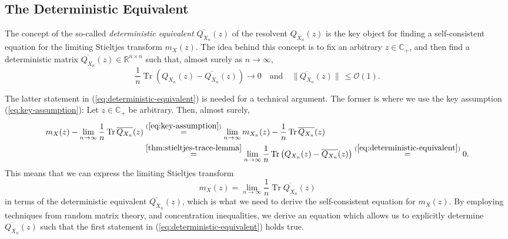 \documentclass{article}
\begin{document}
\subsection{The Deterministic Equivalent} \label{sec:deterministic-equivalent}
The concept of the so-called \emph{deterministic equivalent} $\overline{Q_{X_n}}(z)$ of the resolvent $Q_{X_n}(z)$ is the key object for finding a self-consistent equation for the limiting Stieltjes transform $m_X(z)$. The idea behind this concept is to fix an arbitrary $z\in\mathbb{C}_+$, and then find a deterministic matrix $\overline{Q_{X_n}}(z)\in\mathbb{R}^{n\times n}$ such that, almost surely as $n\to\infty$,
\begin{equation}
\frac{1}{n}\operatorname{Tr}\left(Q_{X_n}(z)- \overline{Q_{X_n}}(z)\right)\to0\quad\text{and}\quad\|\overline{Q_{X_n}}(z)\|\,\leq\mathcal{O}(1).\label{eq:deterministic-equivalent}
\end{equation}
\bigskip
\par
The latter statement in (\ref{eq:deterministic-equivalent}) is needed for a technical argument. The former is where we use the key assumption (\ref{eq:key-assumption}): Let $z\in\mathbb{C}_+$ be arbitrary. Then, almost surely,
\begin{align}
m_X(z)-\lim_{n\to\infty}\frac{1}{n}\operatorname{Tr}\overline{Q_{X_n}}(z) &\stackrel{(\ref{eq:key-assumption})}{=} \lim_{n\to\infty}m_{X_n}(z)-\frac{1}{n}\operatorname{Tr}\overline{Q_{X_n}}(z) \notag
\\ & \stackrel{\ref{thm:stieltjes-trace-lemma}}{=} \lim_{n\to\infty}\frac{1}{n}\operatorname{Tr}\left(Q_{X_n}(z)-\overline{Q_{X_n}}(z)\right)\stackrel{(\ref{eq:deterministic-equivalent})}{=}0.
\end{align}
This means that we can express the limiting Stieltjes transform
\begin{equation}
m_X(z)=\lim_{n\to\infty}\frac{1}{n}\operatorname{Tr}\overline{Q_{X_n}}(z)\label{eq:m=TrQ}
\end{equation}
in terms of the deterministic equivalent $\overline{Q_{X_n}}(z)$, which is what we need to derive the self-consistent equation for $m_X(z)$. By employing techniques from random matrix theory, and concentration inequalities, we derive an equation which allows us to explicitly determine $\overline{Q_{X_n}}(z)$ such that the first statement in (\ref{eq:deterministic-equivalent}) holds true.
\end{document}
